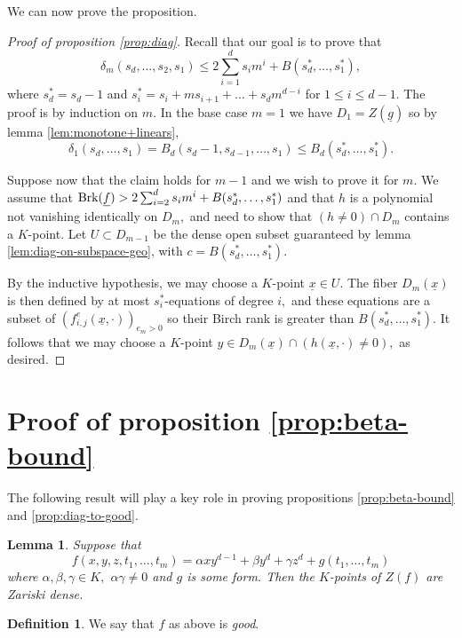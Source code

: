 \documentclass[12pt]{amsart}
\let\ul\underline
\newtheorem{lemma}[theorem]{Lemma}
\theoremstyle{definition}
\newtheorem{definition}[theorem]{Definition}
\newcommand{\brk}{\textnormal{Brk}}
\let\ul\underline
\begin{document}
We can now prove the proposition.

\begin{proof}[Proof of proposition  \ref{prop:diag}]
    Recall that our goal is to prove that
     \[
    \delta_m(s_d,\ldots,s_2,s_1) \le 2\sum_{i=1}^d s_im^i+B(s^*_d,\ldots,s^*_1),
    \]
    where $s^*_d = s_d-1$ and $s^*_i = s_i+ms_{i+1}+\ldots+s_dm^{d-i}$ for $1\le i\le d-1.$ The proof is by induction on $m.$ In the base case $m=1$ we have $D_1 = Z(\ul{g})$ so by lemma \ref{lem:monotone+linears}, 
    \[
    \delta_1(s_d,\ldots,s_1) = B_d(s_d-1,s_{d-1},\ldots,s_1) \le B_d(s_d^*,\ldots,s_1^*).
    \] 
    
    Suppose now that the claim holds for $m-1$ and we wish to prove it for $m.$ We assume that $\brk(\ul{f}) > 2\sum_{i=2}^d s_im^i+B(s^*_d,\ldots,s^*_1)$ and that $h$ is a polynomial not vanishing identically on $D_m,$ and need to show that $(h\neq 0)\cap D_m$ contains a $K$-point. Let $U\subset D_{m-1}$ be the dense open subset guaranteed by lemma \ref{lem:diag-on-subspace-geo}, with $c = B(s^*_d,\ldots,s^*_1).$ 
     
    By the inductive hypothesis, we may choose a $K$-point $\ul{x}\in U.$ The fiber $D_m(\ul{x})$ is then defined by at most $s_i^*$-equations of degree $i,$ and these equations are a subset of $(f_{i,j}^e(\ul{x},\cdot))_{e_m>0}$ so their Birch rank is greater than $B(s^*_d,\ldots,s^*_1).$ It follows that we may choose a $K$-point $y\in D_m(\ul{x}) \cap (h(\ul{x},\cdot)\neq 0),$ as desired.  
\end{proof}

    \section{Proof of proposition \ref{prop:beta-bound}}

    The following result \cite[Proposition 4.4]{BDS} will play a key role in proving propositions \ref{prop:beta-bound} and \ref{prop:diag-to-good}. 

    \begin{lemma}\label{lem:good-subspace}
        Suppose that
        \[
        f(x,y,z,t_1,\ldots,t_m) = \alpha xy^{d-1}+\beta y^d+\gamma z^d+g(t_1,\ldots,t_m) 
        \]
        where $\alpha,\beta,\gamma\in K,$ $\alpha\gamma \neq 0$ and $g$ is some form. Then the $K$-points of $Z(f)$ are Zariski dense.   
    \end{lemma}

    \begin{definition}
        We say that $f$ as above is \emph{good}.
    \end{definition}
\end{document}
